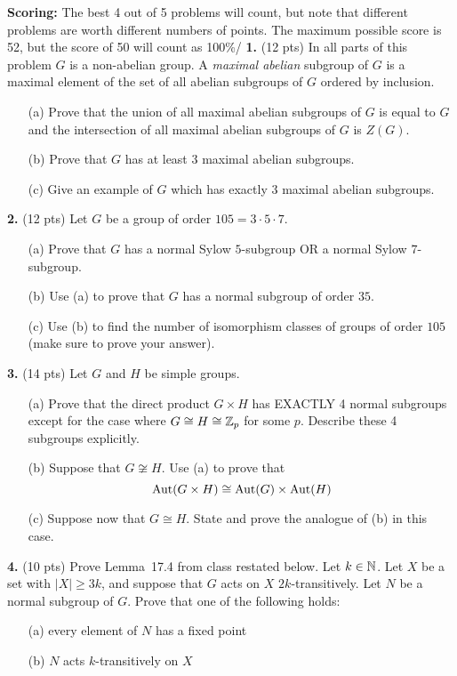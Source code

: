 \documentclass[12pt]{amsart}
\begin{document}
\skv
{\bf Scoring:} The best 4 out of 5 problems will count, but note that different problems are worth different numbers of points. The maximum possible
score is 52, but the score of 50 will count as 100\%/
\skv
{\bf 1.} (12 pts) In all parts of this problem $G$ is a non-abelian group. A {\it maximal abelian} subgroup of $G$ is a maximal element of the set of all abelian subgroups of $G$ ordered by inclusion.
\begin{itemize}
\item[(a)] Prove that the union of all maximal abelian subgroups of $G$ is equal to $G$ and the intersection of all maximal abelian subgroups of $G$ is $Z(G)$.
\item[(b)] Prove that $G$ has at least 3 maximal abelian subgroups. 
\item[(c)] Give an example of $G$ which has exactly $3$ maximal abelian subgroups.
\end{itemize}
\skv
{\bf 2.} (12 pts) Let $G$ be a group of order $105=3\cdot 5\cdot 7$.
\begin{itemize}
\item[(a)] Prove that $G$ has a normal Sylow $5$-subgroup OR a normal Sylow $7$-subgroup.
\item[(b)] Use (a) to prove that $G$ has a normal subgroup of order $35$. 
\item[(c)] Use (b) to find the number of isomorphism classes of groups of order $105$ (make sure to prove your answer).
\end{itemize}
\skv
{\bf 3.} (14 pts) Let $G$ and $H$ be simple groups.
\begin{itemize}
\item[(a)] Prove that the direct product $G\times H$ has EXACTLY 4 normal subgroups except for the case where $G\cong H\cong {\mathbb Z}_p$ for some $p$.
Describe these 4 subgroups explicitly.
\item[(b)] Suppose that $G\not\cong H$. Use (a) to prove that $${\rm Aut}(G\times H)\cong {\rm Aut}(G)\times {\rm Aut}(H)$$
\item[(c)] Suppose now that $G\cong H$. State and prove the analogue of (b) in this case.
\end{itemize}
\skv
{\bf 4.} (10 pts) Prove Lemma~17.4 from class restated below. Let $k\in{\mathbb N}$. Let $X$ be a set with $|X|\geq 3k$, and suppose that $G$ acts on $X$
$2k$-transitively. Let $N$ be a normal subgroup of $G$.
Prove that one of the following holds:
\begin{itemize}
\item[(a)] every element of $N$ has a fixed point
\item[(b)] $N$ acts $k$-transitively on $X$  
\end{itemize}
\end{document}

